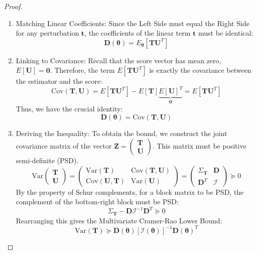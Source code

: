 \documentclass[
  letterpaper,
  DIV=11,
  numbers=noendperiod]{scrreprt}
\renewcommand{\[}{\begin{equation}}
\renewcommand{\]}{\end{equation}}
\theoremstyle{definition}
\theoremstyle{plain}
\theoremstyle{plain}
\theoremstyle{plain}
\theoremstyle{definition}
\theoremstyle{plain}
\theoremstyle{remark}
\begin{document}
\begin{proof}
\begin{enumerate}
\[\begin{aligned}
  &= \mathbf{m}(\boldsymbol{\theta}) + E_{\boldsymbol{\theta}}[\mathbf{T} \mathbf{U}^T] \mathbf{t} + o(\|\mathbf{t}\|)
  \end{aligned}
  \]
\item
  Matching Linear Coefficients: Since the Left Side must equal the Right
  Side for any perturbation \(\mathbf{t}\), the coefficients of the
  linear term \(\mathbf{t}\) must be identical: \[
  \mathbf{D}(\boldsymbol{\theta}) = E_{\boldsymbol{\theta}}[\mathbf{T} \mathbf{U}^T]
  \]
\item
  Linking to Covariance: Recall that the score vector has mean zero,
  \(E[\mathbf{U}] = \mathbf{0}\). Therefore, the term
  \(E[\mathbf{T} \mathbf{U}^T]\) is exactly the covariance between the
  estimator and the score: \[
  \text{Cov}(\mathbf{T}, \mathbf{U}) = E[\mathbf{T} \mathbf{U}^T] - E[\mathbf{T}]\underbrace{E[\mathbf{U}]^T}_{\mathbf{0}} = E[\mathbf{T} \mathbf{U}^T]
  \] Thus, we have the crucial identity: \[
  \mathbf{D}(\boldsymbol{\theta}) = \text{Cov}(\mathbf{T}, \mathbf{U})
  \]
\item
  Deriving the Inequality: To obtain the bound, we construct the joint
  covariance matrix of the vector
  \(\mathbf{Z} = \begin{pmatrix} \mathbf{T} \\ \mathbf{U} \end{pmatrix}\).
  This matrix must be positive semi-definite (PSD). \[
  \text{Var}\begin{pmatrix} \mathbf{T} \\ \mathbf{U} \end{pmatrix} = \begin{pmatrix} \text{Var}(\mathbf{T}) & \text{Cov}(\mathbf{T}, \mathbf{U}) \\ \text{Cov}(\mathbf{U}, \mathbf{T}) & \text{Var}(\mathbf{U}) \end{pmatrix} = \begin{pmatrix} \Sigma_\mathbf{T} & \mathbf{D} \\ \mathbf{D}^T & \mathcal{I} \end{pmatrix} \succeq 0
  \] By the property of Schur complements, for a block matrix to be PSD,
  the complement of the bottom-right block must be PSD: \[
  \Sigma_\mathbf{T} - \mathbf{D} \mathcal{I}^{-1} \mathbf{D}^T \succeq 0
  \] Rearranging this gives the Multivariate Cramer-Rao Lower Bound: \[
  \text{Var}(\mathbf{T}) \succeq \mathbf{D}(\boldsymbol{\theta}) [\mathcal{I}(\boldsymbol{\theta})]^{-1} \mathbf{D}(\boldsymbol{\theta})^T
  \]
\end{enumerate}

\end{proof}
\end{document}
